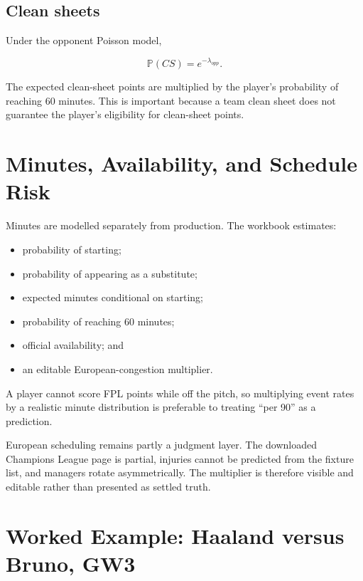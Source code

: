 \documentclass[11pt,a4paper]{article}
\newcommand{\Prob}{\mathbb{P}}
\begin{document}
\subsection{Clean sheets}

Under the opponent Poisson model,

\begin{equation}
\Prob(CS)=e^{-\lambda_{opp}}.
\end{equation}

The expected clean-sheet points are multiplied by the player's probability of reaching 60 minutes. This is important because a team clean sheet does not guarantee the player's eligibility for clean-sheet points.

\section{Minutes, Availability, and Schedule Risk}

Minutes are modelled separately from production. The workbook estimates:

\begin{itemize}
  \item probability of starting;
  \item probability of appearing as a substitute;
  \item expected minutes conditional on starting;
  \item probability of reaching 60 minutes;
  \item official availability; and
  \item an editable European-congestion multiplier.
\end{itemize}

A player cannot score FPL points while off the pitch, so multiplying event rates by a realistic minute distribution is preferable to treating ``per 90'' as a prediction.

European scheduling remains partly a judgment layer. The downloaded Champions League page is partial, injuries cannot be predicted from the fixture list, and managers rotate asymmetrically. The multiplier is therefore visible and editable rather than presented as settled truth.

\section{Worked Example: Haaland versus Bruno, GW3}
\end{document}
